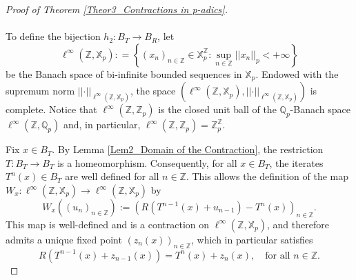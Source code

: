 \documentclass[a4paper, 12pt]{article}
\theoremstyle{definition}
\begin{document}
\begin{proof}[Proof of Theorem \ref{Theor3_Contractions in p-adics}]
		
		
		\paragraph{} 
		
		To define the bijection $h_{2} : B_{T} \to B_{R} $, let 
		$$  \ell^{ \infty } \left(  \mathbb{Z} , \mathbb{X}_{p}  \right)  : =    \left\{   \left(  x_{n}   \right)_{n \in \mathbb{Z} } \in \mathbb{X}_{p}^{\mathbb{Z} } :   \sup_{n \in \mathbb{Z} }  \left| \left|  x_{n}  \right|  \right|_{p}   <   + \infty   \right\}  $$
		be the Banach space of bi-infinite bounded sequences in $\mathbb{X}_{p}$. 
		Endowed with the supremum norm $ \left| \left|  \cdot  \right|  \right|_{\ell^{ \infty } \left(  \mathbb{Z} , \mathbb{X}_{p}  \right) }$, the space $ \left(  \ell^{ \infty } \left(  \mathbb{Z} , \mathbb{X}_{p}  \right) ,  \left| \left|  \cdot  \right|  \right|_{\ell^{ \infty } \left(  \mathbb{Z} , \mathbb{X}_{p}  \right) }  \right) $ is complete. Notice that $\ell^{ \infty } \left(  \mathbb{Z} , \mathbb{Z}_{p}  \right) $ is the closed unit ball of the $\mathbb{Q}_{p}$-Banach space $\ell^{ \infty } \left(  \mathbb{Z} , \mathbb{Q}_{p}  \right) $ and, in particular, $\ell^{ \infty } \left(  \mathbb{Z} , \mathbb{Z}_{p}  \right)  = \mathbb{Z}_{p}^{\mathbb{Z} }$. 
		
		Fix $x \in B_{T}$. By Lemma \ref{Lem2_Domain of the Contraction}, the restriction $T: B_{T} \to B_{T}$ is a homeomorphism. Consequently, for all $x \in B_{T}$, the iterates $T^{n} \left(  x  \right)  \in B_{T}$ are well defined for all $n \in \mathbb{Z} $. This allows the definition of the map $W_{x}: \ell^{ \infty } \left(  \mathbb{Z} , \mathbb{X}_{p}  \right)  \to \ell^{ \infty } \left(  \mathbb{Z} , \mathbb{X}_{p}  \right) $ by  
		\begin{equation}\label{Eq3_Fixed Point Operator}
			W_{x} \left(   \left(  u_{n}   \right)_{n \in \mathbb{Z} }  \right)  :=    \left(  R \left(  T^{n-1}(x) + u_{n-1}   \right)  -  T^{n}(x)      \right)_{n \in \mathbb{Z} } .
		\end{equation} 
		This map is well-defined and is a contraction on $\ell^{ \infty } \left(  \mathbb{Z} , \mathbb{X}_{p}  \right) $, and therefore admits a unique fixed point $ \left(  z_{n} \left(  x  \right)    \right)_{n \in \mathbb{Z} }$, which in particular satisfies 
		\begin{equation}\label{Eq3_Fixed Point Recursive Relation} 
			R \left(  T^{n-1} \left(  x  \right)  + z_{n-1} \left(  x  \right)   \right)    =   T^{n} \left(  x  \right)  + z_{n} \left(  x  \right)  , \quad \text{for all } n \in \mathbb{Z} .
		\end{equation}
		

\end{proof}
\end{document}
